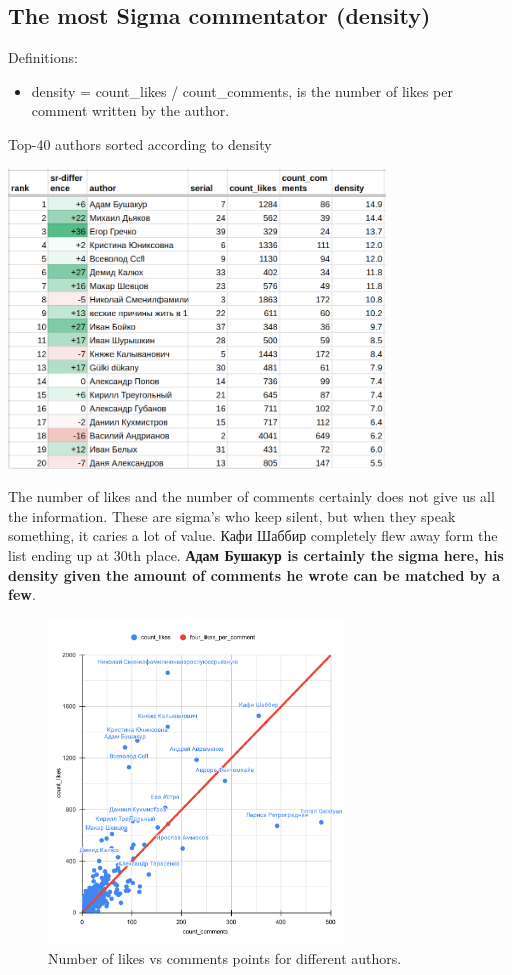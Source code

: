 \documentclass[
	12pt
] {article}
\begin{document}
\subsection{The most Sigma commentator (density)}
	Definitions:
	\begin{itemize}
		\item density = count\_likes / count\_comments, is the number of likes per comment written by the author.
	\end{itemize}

	\begin{table}[H]
		\centering
		\caption{Top-40 authors sorted according to density \cite{sheet-density}}
		\label{table-density}
		\includegraphics[width=0.75\textwidth]{table-density}
	\end{table}

	The number of likes and the number of comments certainly does not give us all the information. These are sigma's who keep silent, but when they speak something, it caries a lot of value. Кафи Шаббир completely flew away form the list ending up at 30th place. \textbf{Адам Бушакур is certainly the sigma here, his density given the amount of comments he wrote can be matched by a few}.

	\begin{figure}[H]
		\centering
		\includegraphics[width=0.7\textwidth]{fig-count-likes-comments-author-points}
		\caption{Number of likes vs comments points for different authors.}
		\label{fig-count-likes-comments-author-points}
	\end{figure}
\end{document}
